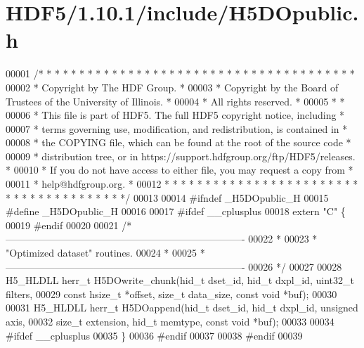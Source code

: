 \hypertarget{_h_d_f5_21_810_81_2include_2_h5_d_opublic_8h_source}{}\section{H\+D\+F5/1.10.1/include/\+H5\+D\+Opublic.h}
\label{_h_d_f5_21_810_81_2include_2_h5_d_opublic_8h_source}

\begin{DoxyCode}
00001 \textcolor{comment}{/* * * * * * * * * * * * * * * * * * * * * * * * * * * * * * * * * * * * * * *}
00002 \textcolor{comment}{ * Copyright by The HDF Group.                                               *}
00003 \textcolor{comment}{ * Copyright by the Board of Trustees of the University of Illinois.         *}
00004 \textcolor{comment}{ * All rights reserved.                                                      *}
00005 \textcolor{comment}{ *                                                                           *}
00006 \textcolor{comment}{ * This file is part of HDF5.  The full HDF5 copyright notice, including     *}
00007 \textcolor{comment}{ * terms governing use, modification, and redistribution, is contained in    *}
00008 \textcolor{comment}{ * the COPYING file, which can be found at the root of the source code       *}
00009 \textcolor{comment}{ * distribution tree, or in https://support.hdfgroup.org/ftp/HDF5/releases.  *}
00010 \textcolor{comment}{ * If you do not have access to either file, you may request a copy from     *}
00011 \textcolor{comment}{ * help@hdfgroup.org.                                                        *}
00012 \textcolor{comment}{ * * * * * * * * * * * * * * * * * * * * * * * * * * * * * * * * * * * * * * */}
00013 
00014 \textcolor{preprocessor}{#ifndef \_H5DOpublic\_H}
00015 \textcolor{preprocessor}{#define \_H5DOpublic\_H}
00016 
00017 \textcolor{preprocessor}{#ifdef \_\_cplusplus}
00018 \textcolor{keyword}{extern} \textcolor{stringliteral}{"C"} \{
00019 \textcolor{preprocessor}{#endif}
00020 
00021 \textcolor{comment}{/*-------------------------------------------------------------------------}
00022 \textcolor{comment}{ *}
00023 \textcolor{comment}{ * "Optimized dataset" routines.}
00024 \textcolor{comment}{ *}
00025 \textcolor{comment}{ *-------------------------------------------------------------------------}
00026 \textcolor{comment}{ */}
00027 
00028 H5\_HLDLL herr\_t H5DOwrite\_chunk(hid\_t dset\_id, hid\_t dxpl\_id, uint32\_t filters, 
00029     \textcolor{keyword}{const} hsize\_t *offset, \textcolor{keywordtype}{size\_t} data\_size, \textcolor{keyword}{const} \textcolor{keywordtype}{void} *buf);
00030 
00031 H5\_HLDLL herr\_t H5DOappend(hid\_t dset\_id, hid\_t dxpl\_id, \textcolor{keywordtype}{unsigned} axis,
00032     \textcolor{keywordtype}{size\_t} extension, hid\_t memtype, \textcolor{keyword}{const} \textcolor{keywordtype}{void} *buf);
00033 
00034 \textcolor{preprocessor}{#ifdef \_\_cplusplus}
00035 \}
00036 \textcolor{preprocessor}{#endif}
00037 
00038 \textcolor{preprocessor}{#endif}
00039 
\end{DoxyCode}
